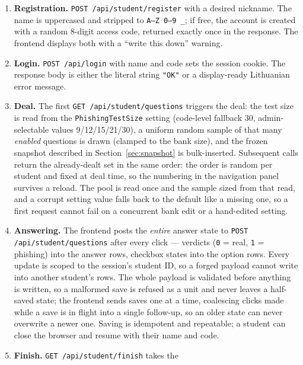 \documentclass[11pt,a4paper]{article}
\newcommand{\code}[1]{\texttt{#1}}
\begin{document}
\begin{enumerate}
  \item \textbf{Registration.} \code{POST /api/student/register} with
        a desired nickname. The name is uppercased and stripped to
        \code{A--Z 0--9 \_}; if free, the account is created with a
        random 8-digit access code, returned exactly once in the
        response. The frontend displays both with a
        ``write this down'' warning.
  \item \textbf{Login.} \code{POST /api/login} with name and code sets
        the session cookie. The response body is either the literal
        string \code{"OK"} or a display-ready Lithuanian error
        message.
  \item \textbf{Deal.} The first
        \code{GET /api/student/questions} triggers the deal: the test
        size is read from the \code{PhishingTestSize} setting
        (code-level fallback 30, admin-selectable values
        9/12/15/21/30), a uniform random sample of that many
        \emph{enabled} questions is drawn (clamped to the bank size),
        and the frozen snapshot described in
        Section~\ref{sec:snapshot} is bulk-inserted. Subsequent calls
        return the already-dealt set in the same order: the order is
        random per student and fixed at deal time, so the numbering
        in the navigation panel survives a reload. The pool is read
        once and the sample sized from that read, and a corrupt
        setting value falls back to the default like a missing one,
        so a first request cannot fail on a concurrent bank edit or a
        hand-edited setting.
  \item \textbf{Answering.} The frontend posts the \emph{entire}
        answer state to \code{POST /api/student/questions} after every
        click --- verdicts (\code{0} = real, \code{1} = phishing) into
        the answer rows, checkbox states into the option rows. Every
        update is scoped to the session's student ID, so a forged
        payload cannot write into another student's rows. The whole
        payload is validated before anything is written, so a
        malformed save is refused as a unit and never leaves a
        half-saved state; the frontend sends saves one at a time,
        coalescing clicks made while a save is in flight into a single
        follow-up, so an older state can never overwrite a newer one.
        Saving is idempotent and repeatable; a student can close the
        browser and resume with their name and code.
  \item \textbf{Finish.} \code{GET /api/student/finish} takes the

\end{enumerate}
\end{document}
